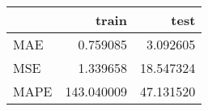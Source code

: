 \begin{tabular}{lrr}
\toprule
{} &       train &       test \\
\midrule
MAE  &    0.759085 &   3.092605 \\
MSE  &    1.339658 &  18.547324 \\
MAPE &  143.040009 &  47.131520 \\
\bottomrule
\end{tabular}
